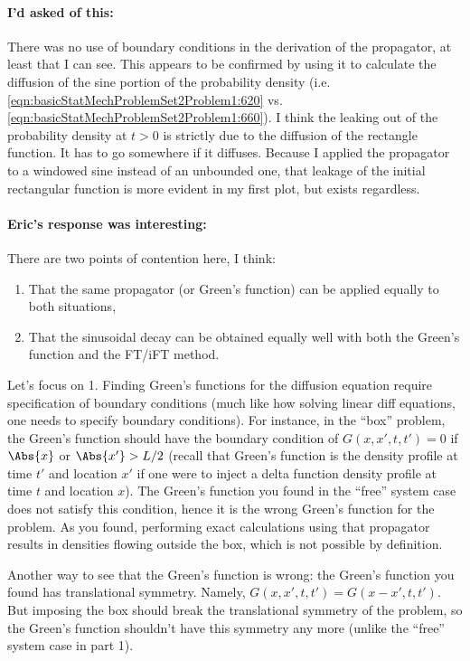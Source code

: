 {\paragraph{I'd asked of this:}

There was no use of boundary conditions in the derivation of the propagator, at least that I can see.  This appears to be confirmed by using it to calculate the diffusion of the sine portion of the probability density (i.e. \ref{eqn:basicStatMechProblemSet2Problem1:620} vs. \ref{eqn:basicStatMechProblemSet2Problem1:660}).  I think the leaking out of the probability density at $t > 0$ is strictly due to the diffusion of the rectangle function.  It has to go somewhere if it diffuses.  Because I applied the propagator to a windowed sine instead of an unbounded one, that leakage of the initial rectangular function is more evident in my first plot, but exists regardless.

\paragraph{Eric's response was interesting:}

There are two points of contention here, I think:

\begin{enumerate}
\item That the same propagator (or Green's function) can be applied equally to both situations, 
\item That the sinusoidal decay can be obtained equally well with both the Green's function and the FT/iFT method.
\end{enumerate}

Let's focus on 1.  Finding Green's functions for the diffusion equation require specification of boundary conditions (much like how solving linear diff equations, one needs to specify boundary conditions).  For instance, in the ``box'' problem, the Green's function should have the boundary condition of $G(x,x',t,t') = 0$ if $\Abs{x}$ or $\Abs{x'} > L/2$ (recall that Green's function is the density profile at time $t'$ and location $x'$ if one were to inject a delta function density profile at time $t$ and location $x$).  The Green's function you found in the ``free'' system case does not satisfy this condition, hence it is the wrong Green's function for the problem.  As you found, performing exact calculations using that propagator results in densities flowing outside the box, which is not possible by definition.

Another way to see that the Green's function is wrong: the Green's function you found has translational symmetry.  Namely, $G(x,x',t,t') = G(x-x',t,t')$.  But imposing the box should break the translational symmetry of the problem, so the Green's function shouldn't have this symmetry any more (unlike the ``free'' system case in part 1).

}
